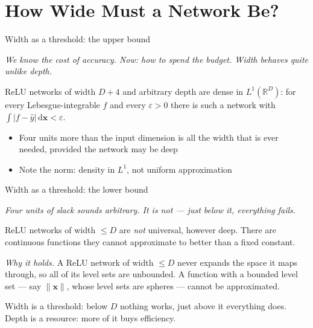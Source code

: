 \documentclass[aspectratio=169, 11pt]{beamer}
\newcommand{\bridge}[1]{%
  {\scriptsize\itshape\color{mcMuted} #1\par}\vspace{0.35em}}
\newcommand{\src}[3]{}      %
\begin{document}
\section{How Wide Must a Network Be?}

\begin{frame}{Width as a threshold: the upper bound}
  \src{lu2017}{section}{3}
  \bridge{We know the cost of accuracy. Now: how to spend the budget.
  Width behaves quite unlike depth.}
  \vspace{0.3em}
  \begin{theorem}
    {\small ReLU networks of width $D+4$ and \alert{arbitrary depth} are
    dense in $L^{1}(\mathbb{R}^{D})$: for every Lebesgue-integrable $f$
    and every $\varepsilon>0$ there is such a network with
    $\int|f-\hat y|\,\mathrm{d}\mathbf{x}<\varepsilon$.}
  \end{theorem}
  \vspace{0.5em}
  {\small
  \begin{itemize}\setlength{\itemsep}{4pt}
    \item Four units more than the input dimension is \alert{all} the
          width that is ever needed, provided the network may be deep
    \item Note the norm: density in $L^{1}$, not uniform
          approximation
  \end{itemize}}
\end{frame}

\begin{frame}{Width as a threshold: the lower bound}
  \src{hanin2017}{section}{3}
  \src{johnson2019}{section}{4}
  \bridge{Four units of slack sounds arbitrary. It is not --- just below
  it, everything fails.}
  \vspace{0.05em}
  \begin{theorem}
    {\small ReLU networks of width \alert{$\leq D$} are \emph{not}
    universal, however deep. There are continuous functions they cannot
    approximate to better than a fixed constant.}
  \end{theorem}
  \vspace{0.0em}
  {\small
  \emph{Why it holds.} A ReLU network of width $\leq D$ never expands
  the space it maps through, so all of its \alert{level sets are
  unbounded}. A function with a bounded level set --- say
  $\lVert\mathbf{x}\rVert$, whose level sets are spheres --- cannot be
  approximated.}
  \vspace{-0.05em}
  \begin{redhighlight}
    {\small \alert{Width is a threshold}: below $D$ nothing works, just
    above it everything does. \alert{Depth is a resource}: more of it
    buys efficiency.}
  \end{redhighlight}
\end{frame}
\end{document}
